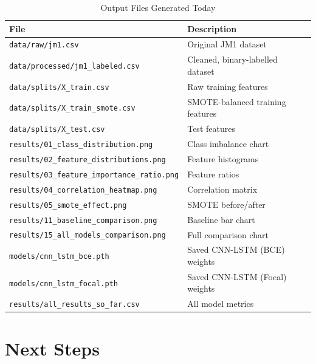 \documentclass[12pt,a4paper]{article}
\begin{document}
\begin{table}[H]
  \centering
  \caption{Output Files Generated Today}
  \begin{tabular}{ll}
    \toprule
    \textbf{File} & \textbf{Description} \\
    \midrule
    \texttt{data/raw/jm1.csv}                & Original JM1 dataset \\
    \texttt{data/processed/jm1\_labeled.csv} & Cleaned, binary-labelled dataset \\
    \texttt{data/splits/X\_train.csv}        & Raw training features \\
    \texttt{data/splits/X\_train\_smote.csv} & SMOTE-balanced training features \\
    \texttt{data/splits/X\_test.csv}         & Test features \\
    \texttt{results/01\_class\_distribution.png} & Class imbalance chart \\
    \texttt{results/02\_feature\_distributions.png} & Feature histograms \\
    \texttt{results/03\_feature\_importance\_ratio.png} & Feature ratios \\
    \texttt{results/04\_correlation\_heatmap.png} & Correlation matrix \\
    \texttt{results/05\_smote\_effect.png}   & SMOTE before/after \\
    \texttt{results/11\_baseline\_comparison.png} & Baseline bar chart \\
    \texttt{results/15\_all\_models\_comparison.png} & Full comparison chart \\
    \texttt{models/cnn\_lstm\_bce.pth}       & Saved CNN-LSTM (BCE) weights \\
    \texttt{models/cnn\_lstm\_focal.pth}     & Saved CNN-LSTM (Focal) weights \\
    \texttt{results/all\_results\_so\_far.csv} & All model metrics \\
    \bottomrule
  \end{tabular}
\end{table}

\section{Next Steps}
\end{document}
